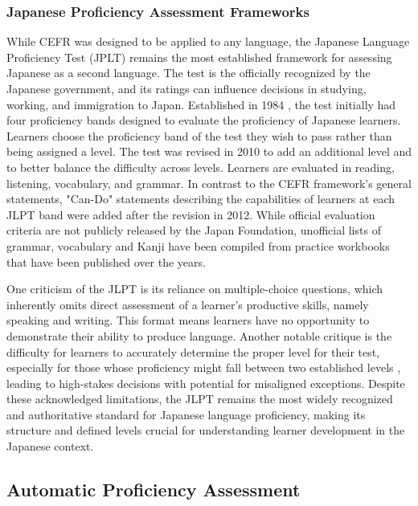 \subsubsection{Japanese Proficiency Assessment Frameworks}
While CEFR was designed to be applied to any language, the Japanese Language Proficiency Test (JPLT) remains the
most established framework for assessing Japanese as a second language. The test is the officially
recognized by the Japanese government, and its ratings can influence decisions in studying, working, and immigration to
Japan.  
Established in
1984
\citet{JLPTinfo}, the
test initially had four
proficiency bands
designed to evaluate the proficiency of Japanese learners. Learners choose the proficiency band of the test they
wish to pass rather than being assigned a level. The test was revised in 2010 to add an additional level and to
better balance the difficulty across levels. Learners are evaluated in reading, listening,
vocabulary, and grammar. In contrast to the CEFR framework's general statements,
"Can-Do" statements describing the
capabilities of
learners at
each
JLPT band were added after the revision in 2012. While official evaluation criteria are not publicly released by the
Japan
Foundation,
unofficial lists of grammar, vocabulary and Kanji have been compiled from practice workbooks that
have been published over the years.

One criticism of the JLPT is its reliance on multiple-choice questions, which inherently omits direct assessment of
a learner's productive skills, namely speaking and writing\citet{JLPTcriticism}. This format means learners have
no opportunity to demonstrate their ability to produce language. Another notable critique is the difficulty for
learners to accurately determine the proper level for their test, especially for those whose proficiency might fall
between two established levels \citep{JLPTcriticism}, leading to high-stakes decisions with potential for misaligned
exceptions. Despite these acknowledged limitations, the JLPT remains the most widely
recognized and authoritative standard for Japanese language proficiency, making its structure and defined levels
crucial for understanding learner development in the Japanese context.

\subsection{Automatic Proficiency Assessment}

